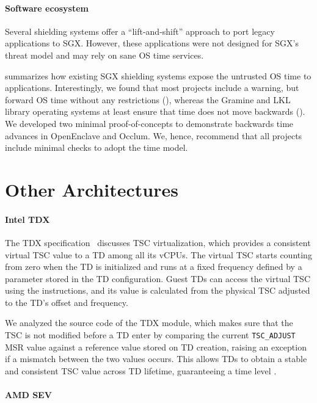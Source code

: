 \paragraph{Software ecosystem}
Several shielding systems offer a ``lift-and-shift'' approach to port legacy
applications to SGX. However, these applications were not designed for SGX's
threat model and may rely on sane OS time services.

 summarizes how existing SGX shielding systems expose the
untrusted OS time to applications. Interestingly, we found that most projects
include a warning, but forward OS time without any restrictions (\Tzero{}),
whereas the Gramine and LKL library operating systems at least ensure that time
does not move backwards (\Tone{}). We developed two minimal proof-of-concepts to
demonstrate backwards time advances in OpenEnclave and Occlum. We, hence,
recommend that all projects include minimal checks to adopt the \Tone{} time
model.

\section{Other Architectures}
\paragraph{Intel TDX}

The TDX specification~\cite{intelTdxSpec} discusses \ac{TSC} virtualization,
which provides a consistent virtual \ac{TSC} value to a \ac{TD} among all its
vCPUs. The virtual \ac{TSC} starts counting from zero when the \ac{TD} is
initialized and runs at a fixed frequency defined by a parameter stored in the
TD configuration. Guest \acp{TD} can access the virtual \ac{TSC} using the
 instructions, and its value is calculated from the physical
\ac{TSC} adjusted to the \ac{TD}'s offset and frequency. 

We analyzed the source code of the TDX module, which makes sure that the
\ac{TSC} is not modified before a \ac{TD} enter by comparing the current
\texttt{TSC\_ADJUST} \ac{MSR} value against a reference value stored on \ac{TD}
creation, raising an exception if a mismatch between the two values occurs. This
allows \acp{TD} to obtain a stable and consistent \ac{TSC} value across \ac{TD}
lifetime, guaranteeing a time level \Tthree{}.

\paragraph{AMD SEV}

